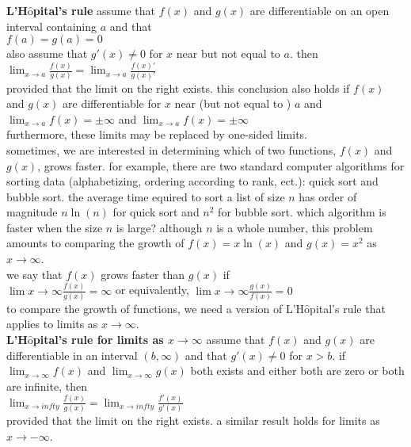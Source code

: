 \documentclass{article}
\begin{document}
\textbf{L'H$\hat{\text{o}}$pital's rule} assume that $f(x)$ and $g(x)$ are differentiable on an open interval containing $a$ and that\\ $f(a) = g(a) = 0$\\ also assume that $g'(x) \neq 0$ for $x$ near but not equal to $a$. then\\ $\lim_{x \to a}\frac{f(x)}{g(x)} = \lim_{x \to a}\frac{f(x)'}{g(x)'}$\\ provided that the limit on the right exists. this conclusion also holds if $f(x)$ and $g(x)$ are differentiable for $x$ near (but not equal to ) $a$ and\\ $\lim_{x \to a}f(x) = \pm\infty$ and $\lim_{x \to a}f(x) = \pm\infty$\\ furthermore, these limits may be replaced by one-sided limits.\\

sometimes, we are interested in determining which of two functions, $f(x)$ and $g(x)$, grows faster. for example, there are two standard computer algorithms for sorting data (alphabetizing, ordering according to rank, ect.): quick sort and bubble sort. the average time equired to sort a list of size $n$ has order of magnitude $n\ln(n)$ for quick sort and $n^2$ for bubble sort. which algorithm is faster when the size $n$ is large? although $n$ is a whole number, this problem amounts to comparing the growth of $f(x) = x\ln(x)$ and $g(x) = x^2$ as $x \to \infty$.\\ we say that $f(x)$ grows faster than $g(x)$ if\\ $\lim{x \to \infty}\frac{f(x)}{g(x)} = \infty$ or equivalently, $\lim{x \to \infty}\frac{g(x)}{f(x)} = 0$\\ to compare the growth of functions, we need a version of L'H$\hat{\text{o}}$pital's rule that applies to limits as $x \to \infty$.\\

\textbf{L'H$\hat{\text{o}}$pital's rule for limits as $x \to \infty$} assume that $f(x)$ and $g(x)$ are differentiable in an interval $(b, \infty)$ and that $g'(x) \neq 0$ for $x > b$. if $\lim_{x \to \infty}f(x)$ and $\lim_{x \to \infty}g(x)$ both exists and either both are zero or both are infinite, then\\ $\lim_{x \to infty}\frac{f(x)}{g(x)} = \lim_{x \to infty}\frac{f'(x)}{g'(x)}$\\ provided that the limit on the right exists. a similar result holds for limits as $x \to -\infty$.\\
\end{document}
